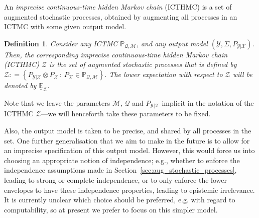 \documentclass[3p]{elsarticle}
\newtheorem{definition}{Definition}
\newcommand{\states}{\mathcal{X}}
\newcommand{\observs}{\mathcal{Y}}
\newcommand{\rateset}{\mathcal{Q}}
\newcommand{\coloneqq}{:\!=}
\begin{document}
An \emph{imprecise continuous-time hidden Markov chain} (ICTHMC) is a set of augmented stochastic processes, obtained by augmenting all processes in an ICTMC with some given output model.
\begin{definition}\label{def:hidden_ictmc}
Consider any ICTMC $\mathbb{P}_{\rateset,\mathcal{M}}$, and any output model $(\observs,\Sigma,P_{\observs\vert\states})$. Then, the corresponding \emph{imprecise continuous-time hidden Markov chain} (ICTHMC) $\mathcal{Z}$ is the set of augmented stochastic processes that is defined by
$\mathcal{Z} \coloneqq \left\{ P_{\observs\vert\states}\otimes P_{\states} \,:\, P_{\states}\in\mathbb{P}_{\rateset,\mathcal{M}}\right\}$.
The lower expectation with respect to $\mathcal{Z}$ will be denoted by $\underline{\mathbb{E}}_\mathcal{Z}$.
\end{definition}
Note that we leave the parameters $\mathcal{M}$, $\rateset$ and $P_{\observs\vert\states}$ implicit in the notation of the ICTHMC $\mathcal{Z}$---we will henceforth take these parameters to be fixed.

Also, the output model is taken to be precise, and shared by all processes in the set. One further generalisation that we aim to make in the future is to allow for an imprecise specification of this output model. However, this would force us into choosing an appropriate notion of independence; e.g., whether to enforce the independence assumptions made in Section~\ref{sec:aug_stochastic_processes}, leading to strong or complete independence, or to only enforce the lower envelopes to have these independence properties, leading to epistemic irrelevance. It is currently unclear which choice should be preferred, e.g. with regard to computability, so at present we prefer to focus on this simpler model.
\end{document}
